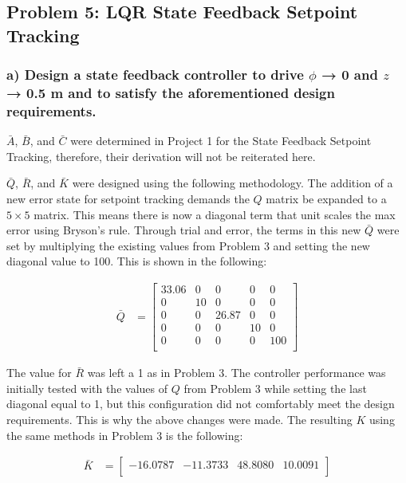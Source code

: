 \subsection*{Problem 5: LQR State Feedback Setpoint Tracking}
\subsubsection*{a) Design a state feedback controller to drive $\phi$ → 0 and $z$ → 0.5 m and to satisfy the aforementioned
    design requirements.}
$\bar{A}$, $\bar{B}$, and $\bar{C}$ were determined in Project 1 for the State Feedback Setpoint Tracking, therefore, their derivation will not be reiterated here.

$\bar{Q}$, $\bar{R}$, and $\bar{K}$ were designed using the following methodology. The addition of a new error state for setpoint tracking demands the $Q$ matrix be expanded to a $5\times5$ matrix. This means there is now a diagonal term that unit scales the max error using Bryson's rule. Through trial and error, the terms in this new $\bar{Q}$ were set by multiplying the existing values from Problem 3 and setting the new diagonal value to 100. This is shown in the following:

\begin{equation*}
    \begin{split}
        \bar{Q} & =
        \begin{bmatrix}
            33.06 & 0  & 0     & 0  & 0   \\
            0     & 10 & 0     & 0  & 0   \\
            0     & 0  & 26.87 & 0  & 0   \\
            0     & 0  & 0     & 10 & 0   \\
            0     & 0  & 0     & 0  & 100 \\
        \end{bmatrix}
    \end{split}
\end{equation*}

The value for $\bar{R}$ was left a 1 as in Problem 3. The controller performance was initially tested with the values of $Q$ from Problem 3 while setting the last diagonal equal to 1, but this configuration did not comfortably meet the design requirements. This is why the above changes were made. The resulting $K$ using the same methods in Problem 3 is the following:

\begin{equation*}
    \begin{split}
        \bar{K} & =
        \begin{bmatrix}
            -16.0787 & -11.3733 & 48.8080 & 10.0091 \\
        \end{bmatrix}
    \end{split}
\end{equation*}

